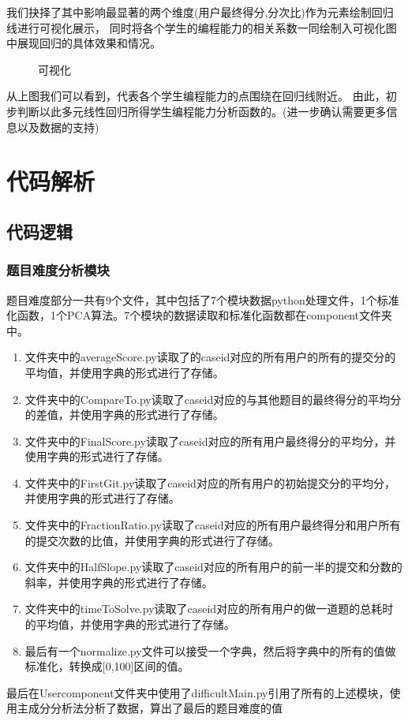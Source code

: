 \documentclass[UTF8]{ctexart}
\begin{document}
我们抉择了其中影响最显著的两个维度(用户最终得分,分次比)作为元素绘制回归线进行可视化展示，
同时将各个学生的编程能力的相关系数一同绘制入可视化图中展现回归的具体效果和情况。

\begin{figure}[htb] 
\caption{\label{1} 可视化} 
\end{figure}

从上图我们可以看到，代表各个学生编程能力的点围绕在回归线附近。
由此，初步判断以此多元线性回归所得学生编程能力分析函数的。(进一步确认需要更多信息以及数据的支持)
\section{代码解析}
\subsection{代码逻辑}
\subsubsection{题目难度分析模块}
题目难度部分一共有9个文件，其中包括了7个模块数据python处理文件，1个标准化函数，1个PCA算法。7个模块的数据读取和标准化函数都在component文件夹中。

\begin{enumerate}[(1)]

    \item 文件夹中的averageScore.py读取了的caseid对应的所有用户的所有的提交分的平均值，并使用字典的形式进行了存储。
    \item 文件夹中的CompareTo.py读取了caseid对应的与其他题目的最终得分的平均分的差值，并使用字典的形式进行了存储。
    \item 文件夹中的FinalScore.py读取了caseid对应的所有用户最终得分的平均分，并使用字典的形式进行了存储。
    \item 文件夹中的FirstGit.py读取了caseid对应的所有用户的初始提交分的平均分，并使用字典的形式进行了存储。
    \item 文件夹中的FractionRatio.py读取了caseid对应的所有用户最终得分和用户所有的提交次数的比值，并使用字典的形式进行了存储。
    \item 文件夹中的HalfSlope.py读取了caseid对应的所有用户的前一半的提交和分数的斜率，并使用字典的形式进行了存储。
    \item 文件夹中的timeToSolve.py读取了caseid对应的所有用户的做一道题的总耗时的平均值，并使用字典的形式进行了存储。
    \item 最后有一个normalize.py文件可以接受一个字典，然后将字典中的所有的值做标准化，转换成[0,100]区间的值。

\end{enumerate}
最后在Usercomponent文件夹中使用了difficultMain.py引用了所有的上述模块，使用主成分分析法分析了数据，算出了最后的题目难度的值
\end{document}
